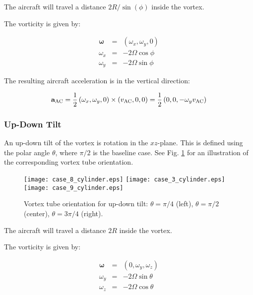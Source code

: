\documentclass[smallextended]{svjour3}       %
\begin{document}
The aircraft will travel a distance $2R/\sin(\phi)$ inside the vortex.

The vorticity is given by:

\begin{eqnarray}
  \boldsymbol\omega &=& \left(\omega_x,\omega_y,0 \right) \\
  \omega_x &=& -2 \Omega \cos \phi\\
  \omega_y &=& -2 \Omega\sin \phi
\end{eqnarray}

The resulting aircraft acceleration is in the vertical direction:

\begin{equation}
{\bf a}_{\rm AC} = \frac{1}{2} \left( \omega_x,\omega_y,0 \right) \times \left(v_{\rm AC},0,0\right) = \frac{1}{2} \left( 0,0,-\omega_y v_{\rm AC} \right)
\end{equation}

\subsubsection{Up-Down Tilt}

An up-down tilt of the vortex is rotation in the $xz$-plane. This is defined using the polar angle $\theta$, where $\pi/2$ is the baseline case. See Fig. \ref{fig:theta_cylinder} for an illustration of the corresponding vortex tube orientation.

\begin{figure}
\texttt{[image: case\_8\_cylinder.eps]}
\hspace{0.5cm}
\texttt{[image: case\_3\_cylinder.eps]}
\hspace{0.5cm}
\texttt{[image: case\_9\_cylinder.eps]}
\caption{Vortex tube orientation for up-down tilt: $\theta=\pi/4$ (left), $\theta=\pi/2$ (center), $\theta=3\pi/4$ (right).}
\label{fig:theta_cylinder}
\end{figure}

The aircraft will travel a distance $2R$ inside the vortex.

The vorticity is given by:

\begin{eqnarray}
  \boldsymbol\omega &=& \left(0,\omega_y,\omega_z \right) \\
  \omega_y  &=& -2 \Omega \sin \theta \\
  \omega_z &=& -2 \Omega \cos \theta
\end{eqnarray}
\end{document}
